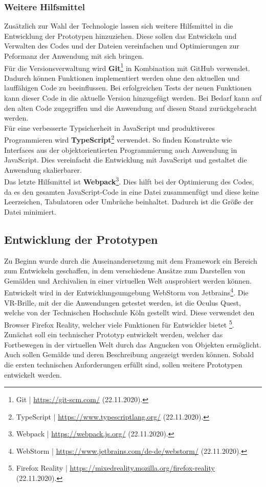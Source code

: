\documentclass[a4paper,12pt,oneside]{article}
\begin{document}
      \subsubsection{Weitere Hilfsmittel}
        Zusätzlich zur Wahl der Technologie lassen sich weitere Hilfsmittel
        in die Entwicklung der Prototypen hinzuziehen. Diese sollen das
        Entwickeln und Verwalten des Codes und der Dateien vereinfachen und
        Optimierungen zur Peformanz der Anwendung mit sich
        bringen. \\
        Für die Versionsverwaltung wird \textbf{Git}\footnote{Git | \url{https://git-scm.com/} (22.11.2020).} in Kombination mit GitHub
        verwendet. Dadurch können Funktionen implementiert werden ohne den
        aktuellen und lauffähigen Code zu beeinflussen. Bei erfolgreichen
        Tests der neuen Funktionen kann dieser Code in die aktuelle Version
        hinzugefügt werden. Bei Bedarf kann auf den alten Code zugegriffen 
        und die Anwendung auf diesen Stand zurückgebracht werden. \\
        Für eine verbesserte Typsicherheit in JavaScript und produktiveres
        Programmieren wird \textbf{TypeScript}\footnote{TypeScript | \url{https://www.typescriptlang.org/} (22.11.2020).} verwendet. So finden Konstrukte
        wie Interfaces aus der objektorientierten Programmierung auch
        Anwendung in JavaScript. Dies vereinfacht 
        die Entwicklung mit JavaScript und gestaltet die Anwendung skalierbarer. \\
        Das letzte Hilfsmittel ist \textbf{Webpack}\footnote{Webpack | \url{https://webpack.js.org/} (22.11.2020).}. Dies
        hilft bei der Optimierung des Codes, da es den gesamten JavaScript-Code
        in eine Datei zusammenfügt und diese keine Leerzeichen, Tabulatoren
        oder Umbrüche beinhaltet. Dadurch ist die Größe der Datei minimiert.
    \subsection{Entwicklung der Prototypen}
      Zu Beginn wurde durch die Auseinandersetzung mit dem Framework ein 
      Bereich zum Entwickeln geschaffen, in dem verschiedene 
      Ansätze zum Darstellen von
      Gemälden und Archivalien in einer virtuellen Welt ausprobiert werden
      können. \\
      Entwickelt wird in der Entwicklungsumgebung WebStorm von Jetbrains\footnote{WebStorm | \url{https://www.jetbrains.com/de-de/webstorm/} (22.11.2020).}.
      Die VR-Brille, mit der die Anwendungen getestet werden, ist die Oculus Quest,
      welche von der Technischen Hochschule Köln gestellt wird. Diese verwendet
      den Browser Firefox Reality, welcher viele Funktionen für Entwickler 
      bietet \footnote{Firefox Reality | \url{https://mixedreality.mozilla.org/firefox-reality} (22.11.2020).}. \\
      Zunächst soll ein technischer Prototyp entwickelt werden, welcher das
      Fortbewegen in der virtuellen Welt durch das Angucken von Objekten ermöglicht.
      Auch sollen Gemälde und deren Beschreibung angezeigt werden können. Sobald
      die ersten technischen Anforderungen erfüllt sind, 
      sollen weitere Prototypen entwickelt werden.
\end{document}
